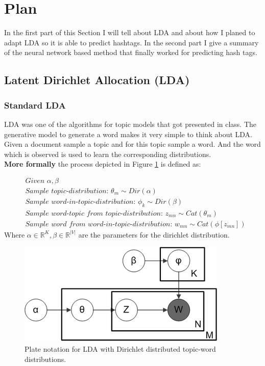 \documentclass[10pt,conference,compsocconf]{IEEEtran}
\newcommand\R{\mathbb{R}}
\begin{document}
\section{Plan}
\label{sec:Plan}
In the first part of this Section I will tell about LDA and about how I planed to adapt LDA so it is able to predict hashtags. In the second part I give a summary of the neural network based method that finally worked for predicting hash tags. 
\subsection{Latent Dirichlet Allocation (LDA)}
\subsubsection{Standard LDA}
LDA was one of the algorithms for topic models that got presented in class. The generative model to generate a word makes it very simple to think about LDA. Given a document sample a topic and for this topic sample a word. And the word which is observed is used to learn the corresponding distributions. \\
\textbf{More formally} the process depicted in Figure \ref{fig:ldaplate} is defined as: 

\small
\begin{align*}
&\textit{Given } \alpha, \beta \\
&\textit{Sample topic-distribution: } \theta_m \sim Dir(\alpha)\\
&\textit{Sample word-in-topic-distribution: } \phi_k \sim Dir(\beta) \\
&\textit{Sample word-topic from topic-distribution: } z_{mn} \sim Cat(\theta_m) \\
&\textit{Sample word from word-in-topic-distribution: } w_{mn} \sim Cat(\phi[z_{mn}])
\end{align*}
\normalsize
Where $\alpha \in \R^K, \beta \in \R^{|V|}$ are the parameters for the dirichlet distribution. 

\begin{figure}
	\centering
	\includegraphics[width=0.7\linewidth]{images/lda_plate}
	\caption{Plate notation for LDA with Dirichlet distributed topic-word distributions.}
	\label{fig:ldaplate}
\end{figure}
\end{document}
